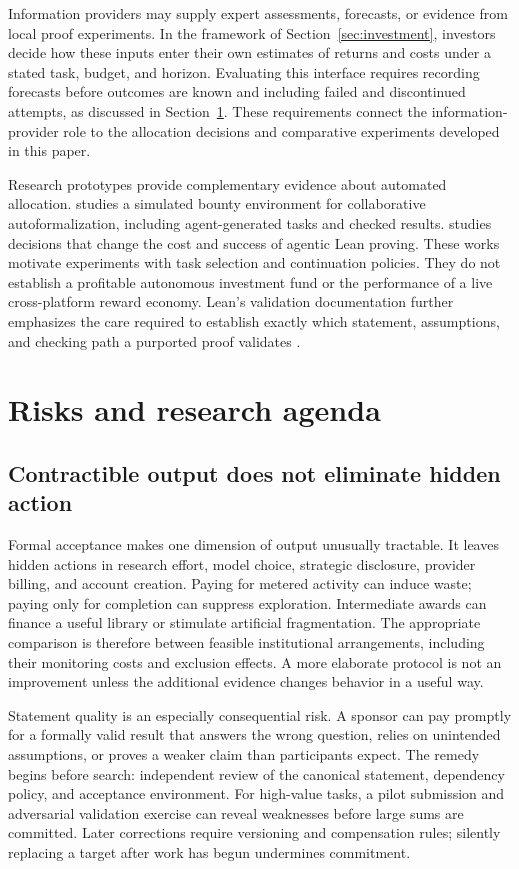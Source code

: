 \documentclass[11pt,a4paper]{article}
\begin{document}
Information providers may supply expert assessments, forecasts, or evidence from local proof experiments. In the framework of Section~\ref{sec:investment}, investors decide how these inputs enter their own estimates of returns and costs under a stated task, budget, and horizon. Evaluating this interface requires recording forecasts before outcomes are known and including failed and discontinued attempts, as discussed in Section~\ref{sec:research}. These requirements connect the information-provider role to the allocation decisions and comparative experiments developed in this paper.

Research prototypes provide complementary evidence about automated allocation. \citet{hunt} studies a simulated bounty environment for collaborative autoformalization, including agent-generated tasks and checked results. \citet{costquality} studies decisions that change the cost and success of agentic Lean proving. These works motivate experiments with task selection and continuation policies. They do not establish a profitable autonomous investment fund or the performance of a live cross-platform reward economy. Lean's validation documentation further emphasizes the care required to establish exactly which statement, assumptions, and checking path a purported proof validates \citep{lean}.

\section{Risks and research agenda}
\label{sec:research}
\subsection{Contractible output does not eliminate hidden action}
Formal acceptance makes one dimension of output unusually tractable. It leaves hidden actions in research effort, model choice, strategic disclosure, provider billing, and account creation. Paying for metered activity can induce waste; paying only for completion can suppress exploration. Intermediate awards can finance a useful library or stimulate artificial fragmentation. The appropriate comparison is therefore between feasible institutional arrangements, including their monitoring costs and exclusion effects. A more elaborate protocol is not an improvement unless the additional evidence changes behavior in a useful way.

Statement quality is an especially consequential risk. A sponsor can pay promptly for a formally valid result that answers the wrong question, relies on unintended assumptions, or proves a weaker claim than participants expect. The remedy begins before search: independent review of the canonical statement, dependency policy, and acceptance environment. For high-value tasks, a pilot submission and adversarial validation exercise can reveal weaknesses before large sums are committed. Later corrections require versioning and compensation rules; silently replacing a target after work has begun undermines commitment.
\end{document}
